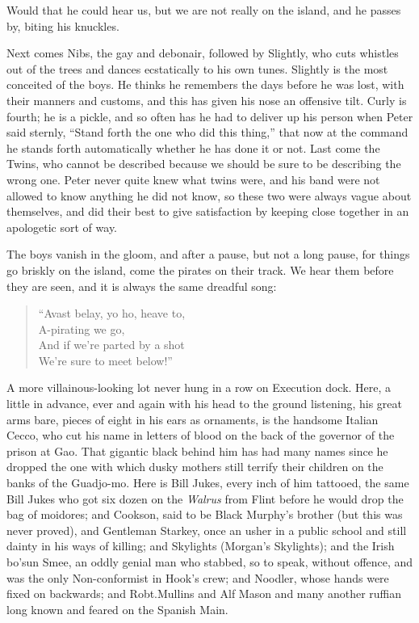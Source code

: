 Would that he could hear us,
but we are not really on the island, and he passes by, biting his knuckles.

Next comes Nibs, the gay and debonair,
followed by Slightly, who cuts whistles out of the trees and dances ecstatically to his own tunes.
Slightly is the most conceited of the boys.
He thinks he remembers the days before he was lost, with their manners and customs,
and this has given his nose an offensive tilt.
Curly is fourth;
he is a pickle,
and so often has he had to deliver up his person when Peter said sternly,
“Stand forth the one who did this thing,”
that now at the command he stands forth automatically whether he has done it or not.
Last come the Twins, who cannot be described because we should be sure to be describing the wrong one.
Peter never quite knew what twins were, and his band were not allowed to know anything he did not know,
so these two were always vague about themselves,
and did their best to give satisfaction by keeping close together in an apologetic sort of way.

The boys vanish in the gloom,
and after a pause, but not a long pause, for things go briskly on the island,
come the pirates on their track.
We hear them before they are seen, and it is always the same dreadful song:

\begin{verse}
	“Avast belay, yo ho, heave to,\\
	A-pirating we go,\\
	And if we’re parted by a shot\\
	We’re sure to meet below!”
\end{verse}

A more villainous-looking lot never hung in a row on Execution dock.
Here, a little in advance, ever and again with his head to the ground listening,
his great arms bare, pieces of eight in his ears as ornaments,
is the handsome Italian Cecco,
who cut his name in letters of blood on the back of the governor of the prison at Gao.
That gigantic black behind him has had many names
since he dropped the one with which dusky mothers still terrify their children on the banks of the Guadjo-mo.
Here is Bill Jukes, every inch of him tattooed,
the same Bill Jukes who got six dozen on the \emph{Walrus} from Flint before he would drop the bag of moidores;
and Cookson, said to be Black Murphy’s brother (but this was never proved),
and Gentleman Starkey, once an usher in a public school and still dainty in his ways of killing;
and Skylights (Morgan’s Skylights);
and the Irish bo’sun Smee,
an oddly genial man who stabbed, so to speak, without offence,
and was the only Non-conformist in Hook’s crew;
and Noodler, whose hands were fixed on backwards;
and Robt.\@ Mullins and Alf Mason and many another ruffian long known and feared on the Spanish Main.


